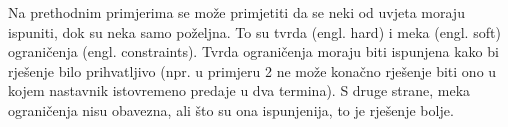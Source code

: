 Na prethodnim primjerima se može primjetiti da se neki od uvjeta moraju ispuniti, dok su neka samo poželjna. To su tvrda
(engl. hard) i meka (engl. soft) ograničenja (engl. constraints). Tvrda ograničenja moraju biti ispunjena kako bi rješenje bilo
prihvatljivo (npr. u primjeru 2 ne može konačno rješenje biti ono u kojem nastavnik istovremeno predaje u dva termina). S druge strane,
meka ograničenja nisu obavezna, ali što su ona ispunjenija, to je rješenje bolje.
